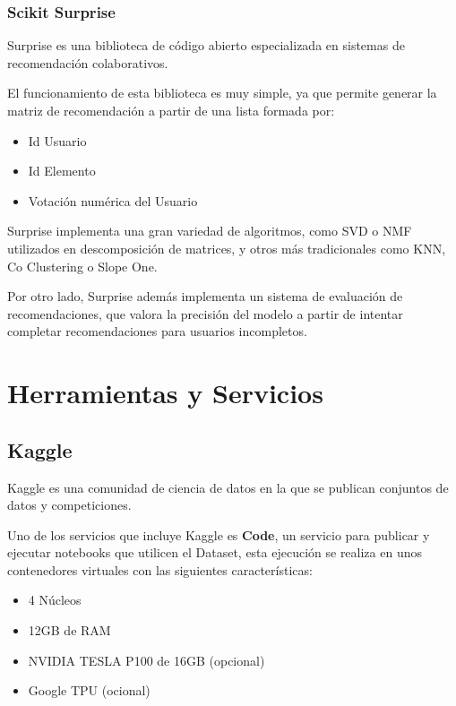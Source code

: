 \hypertarget{scikit-surprise}{%
\subsubsection{Scikit Surprise}\label{scikit-surprise}}

Surprise \cite{supriselib} es una biblioteca de código abierto especializada en sistemas
de recomendación colaborativos.

El funcionamiento de esta biblioteca es muy simple, ya que permite
generar la matriz de recomendación a partir de una lista formada por:

\begin{itemize}
\itemsep0em 
\item
  Id Usuario
\item
  Id Elemento
\item
  Votación numérica del Usuario
\end{itemize}

Surprise implementa una gran variedad de algoritmos, como SVD o NMF
utilizados en descomposición de matrices, y otros más tradicionales como
KNN, Co Clustering o Slope One.

Por otro lado, Surprise además implementa un sistema de evaluación de
recomendaciones, que valora la precisión del modelo a partir de intentar
completar recomendaciones para usuarios incompletos.

\hypertarget{herramientas-y-servicios}{%
\section{Herramientas y Servicios}\label{herramientas-y-servicios}}

\hypertarget{kaggle}{%
\subsection{Kaggle}\label{kaggle}}

Kaggle es una comunidad de ciencia de datos en la que se publican
conjuntos de datos y competiciones.

Uno de los servicios que incluye Kaggle es \textbf{Code}, un servicio
para publicar y ejecutar notebooks que utilicen el Dataset, esta
ejecución se realiza en unos contenedores virtuales con las siguientes
características:

\begin{itemize}
\itemsep0em 
\item
  4 Núcleos
\item
  12GB de RAM
\item
  NVIDIA TESLA P100 de 16GB (opcional)
\item
  Google TPU (ocional)
\end{itemize}

